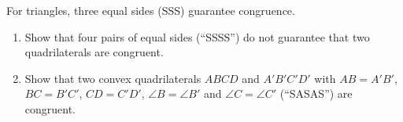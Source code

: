 For triangles, three equal sides (SSS) guarantee congruence. \begin{enumerate}
\item[(a)] Show that four pairs of equal sides (``SSSS'') do not guarantee that two quadrilaterals are congruent.
\item[(b)] Show that two convex quadrilaterals $ABCD$ and $A'B'C'D'$ with $AB=A'B'$, $BC=B'C'$, $CD=C'D'$, $\angle B=\angle B'$ and $\angle C=\angle C'$ (``SASAS'') are congruent.
\end{enumerate}

